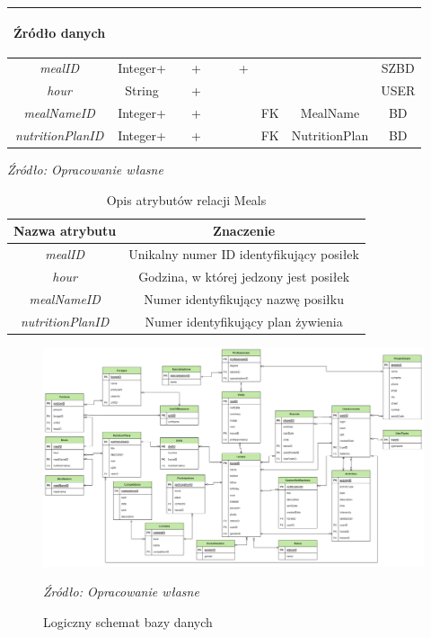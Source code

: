 \documentclass[12pt,oneside]{report}
\begin{document}
\begin{enumerate}[start=10,label={\bfseries REL\textbackslash\arabic*}]
\begin{table}[H]
\begin{tabular}{|c|c|c|c|c|c|c|c|c|c|}
			\begin{sideways}Źródło danych\end{sideways}\\
			\hline
			\textit{mealID}&Integer+&&+&&&+&&&SZBD\\	
			\hline
			\textit{hour}&String&&+&&&&&&USER\\	
			\hline			
			\textit{mealNameID}&Integer+&&+&&&&FK&MealName&BD\\	
			\hline			
			\textit{nutritionPlanID}&Integer+&&+&&&&FK&NutritionPlan&BD\\	
			\hline
		\end{tabular}
	\end{table}
	
	\begin{table}[H]
		\caption{Opis atrybutów relacji Meals}
		\textit{Źródło: Opracowanie własne}
		$\ $
		\label{MealsAttributeDescription}
		\centering
		\begin{tabular}{|c|c|}
			\hline
			Nazwa atrybutu & Znaczenie \\
			\hline
			\textit{mealID}&Unikalny numer ID identyfikujący posiłek\\	
			\hline
			\textit{hour}&Godzina, w której jedzony jest posiłek\\	
			\hline			
			\textit{mealNameID}&Numer identyfikujący nazwę posiłku\\	
			\hline			
			\textit{nutritionPlanID}&Numer identyfikujący plan żywienia\\	
			\hline
		\end{tabular}
	\end{table}
\end{enumerate}
\begin{figure}[H]
	\centering
	\includegraphics[scale=0.35, angle=-90]{DiagramLogiczny}
	\caption{Logiczny schemat bazy danych}
	\textit{Źródło: Opracowanie własne}
	\label{DiagramLogiczny}
\end{figure}
\newpage
\end{document}
